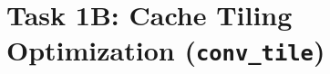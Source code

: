 \documentclass[11pt,a4paper]{article}
\begin{document}


\section{Task 1B: Cache Tiling Optimization (\texttt{conv\_tile})}
\end{document}
